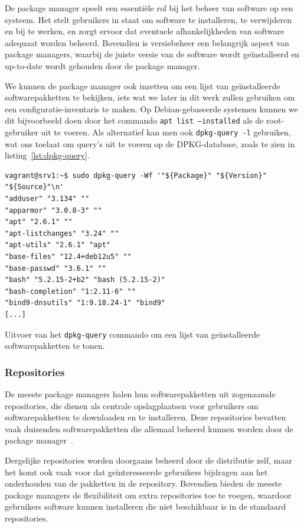 De package manager speelt een essenti\"ele rol bij het beheer van software op een systeem.
Het stelt gebruikers in staat om software te installeren, te verwijderen en bij te werken, en zorgt ervoor dat eventuele afhankelijkheden van software adequaat worden beheerd.
Bovendien is versiebeheer een belangrijk aspect van package managers, waarbij de juiste versie van de software wordt ge\"installeerd en up-to-date wordt gehouden door de package manager.

We kunnen de package manager ook inzetten om een lijst van ge\"installeerde softwarepakketten te bekijken, iets wat we later in dit werk zullen gebruiken om een configuratie-inventaris te maken.
Op Debian-gebaseerde systemen kunnen we dit bijvoorbeeld doen door het commando \texttt{apt list --installed} als de root-gebruiker uit te voeren.
Als alternatief kan men ook \texttt{dpkg-query -l} gebruiken, wat ons toelaat om query's uit te voeren op de DPKG-database, zoals te zien in listing~\ref{lst:dpkg-query}.

\begin{listing}
  \begin{verbatim}
vagrant@srv1:~$ sudo dpkg-query -Wf '"${Package}" "${Version}" "${Source}"\n'
"adduser" "3.134" ""
"apparmor" "3.0.8-3" ""
"apt" "2.6.1" ""
"apt-listchanges" "3.24" ""
"apt-utils" "2.6.1" "apt"
"base-files" "12.4+deb12u5" ""
"base-passwd" "3.6.1" ""
"bash" "5.2.15-2+b2" "bash (5.2.15-2)"
"bash-completion" "1:2.11-6" ""
"bind9-dnsutils" "1:9.18.24-1" "bind9"
[...]
  \end{verbatim}
  \caption{Uitvoer van het \texttt{dpkg-query} commando om een lijst van ge\"installeerde softwarepakketten te tonen.}
  \label{lst:dpkg-query}
\end{listing}

\subsubsection{Repositories}
\label{linux_repositories}

De meeste package managers halen hun softwarepakketten uit zogenaamde repositories, die dienen als centrale opslagplaatsen voor gebruikers om softwarepakketten te downloaden en te installeren.
Deze repositories bevatten vaak duizenden softwarepakketten die allemaal beheerd kunnen worden door de package manager~\autocite{shotts2019linux}.

Dergelijke repositories worden doorgaans beheerd door de distributie zelf, maar het komt ook vaak voor dat ge\"interesseerde gebruikers bijdragen aan het onderhouden van de pakketten in de repository.
Bovendien bieden de meeste package managers de flexibiliteit om extra repositories toe te voegen, waardoor gebruikers software kunnen installeren die niet beschikbaar is in de standaard repositories.

